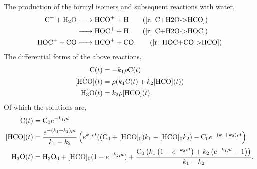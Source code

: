The production of the formyl isomers and subsequent reactions with water,
\begin{align*}
	\ce{C+ + H2O & -> HCO+ + H} \tag{\ref{r: C+H2O->HCO}} \\
	\ce{& -> HOC+ + H} \tag{\ref{r: C+H2O->HOC}} \\
	\ce{HOC+ + CO & -> HCO+ + CO}. \tag{\ref{r: HOC+CO->HCO}}
\end{align*}
The differential forms of the above reactions,
\begin{align*}
	\dot{\ce{C}}(t) & = -k_1 \rho \ce{C}(t) \\
	\dot{\ce{[HCO]}}(t) & = \rho(k_1 \ce{C}(t) + k_2 \ce{[HCO]}(t)) \\
	\dot{\ce{H3O}}(t) & = k_2 \rho \ce{[HCO]}(t).
\end{align*}
Of which the solutions are,
\begin{align}
	\ce{C}(t) & = \ce{C0} e^{-k_1 \rho t} \label{eq: H2O C(t)} \\
	\ce{[HCO]}(t) & = \frac{e^{-(k_1 + k_2) \rho t}}{k_1 - k_2} \left(e^{k_1 \rho t}((\ce{C0} + \ce{[HCO]0})k_1 - \ce{[HCO]0} k_2) - \ce{C0} e^{-(k_1 + k_2) \rho t}\right) \label{eq: H2O [HCO](t)} \\
	\ce{H3O}(t) & = \ce{H3O0} + \ce{[HCO]0} (1 - e^{-k_2 \rho t}) + \frac{\ce{C0}\left( k_1 \left(1 - e^{-k_2 \rho t}\right) + k_2 \left(e^{-k_1 \rho t} - 1\right) \right)}{k_1 - k_2}. \label{eq: H2O H3O(t)}
\end{align}

\section{} \label{sec: [HCO]+X eqs}


